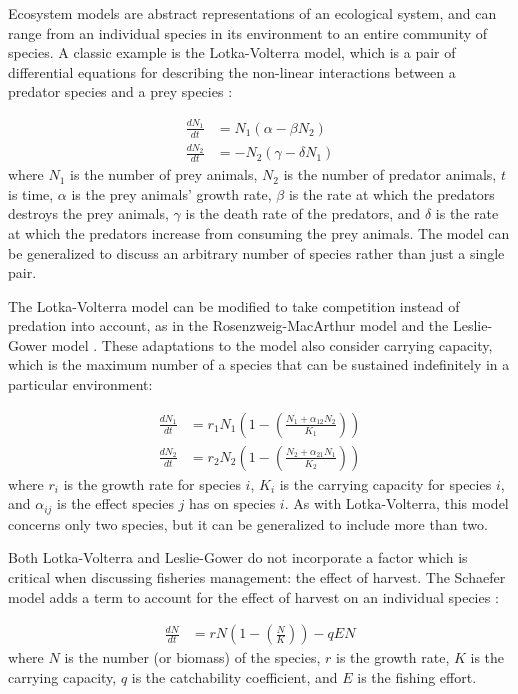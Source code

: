 Ecosystem models are abstract representations of an ecological system, and can range from an individual species in its environment to an entire community of species.  A classic example is the Lotka-Volterra model, which is a pair of differential equations for describing the non-linear interactions between a predator species and a prey species \cite{lotka1926, volterra1926}:

\begin{align}
   \frac{d N_1}{dt} &=   N_1 \left(\alpha - \beta  N_2\right) 
\\ \frac{d N_2}{dt} &= - N_2 \left(\gamma - \delta N_1\right)
\end{align}
where $N_1$ is the number of prey animals, $N_2$ is the number of predator animals, $t$ is time, $\alpha$ is the prey animals' growth rate, $\beta$ is the rate at which the predators destroys the prey animals, $\gamma$ is the death rate of the predators, and $\delta$ is the rate at which the predators increase from consuming the prey animals.  The model can be generalized to discuss an arbitrary number of species rather than just a single pair.

The Lotka-Volterra model can be modified to take competition instead of predation into account, as in the Rosenzweig-MacArthur model \cite{rosenzweig1963} and the Leslie-Gower model \cite{leslie1960}.  These adaptations to the model also consider carrying capacity, which is the maximum number of a species that can be sustained indefinitely in a particular environment:

\begin{align}
   \frac{d N_1}{dt} &= r_1 N_1 \left(1 - \left(\frac{N_1 + \alpha_{12} N_2}{K_1}\right)\right)
\\ \frac{d N_2}{dt} &= r_2 N_2 \left(1 - \left(\frac{N_2 + \alpha_{21} N_1}{K_2}\right)\right)
\end{align}
where $r_i$ is the growth rate for species $i$, $K_i$ is the carrying capacity for species $i$, and $\alpha_{ij}$ is the effect species $j$ has on species $i$.  As with Lotka-Volterra, this model concerns only two species, but it can be generalized to include more than two.

Both Lotka-Volterra and Leslie-Gower do not incorporate a factor which is critical when discussing fisheries management: the effect of harvest.  The Schaefer model adds a term to account for the effect of harvest on an individual species \cite{schaefer1957}:

\begin{align}
   \frac{d N}{dt} &= r N \left(1 - \left(\frac{N}{K}\right)\right) - q E N
\end{align}
where $N$ is the number (or biomass) of the species, $r$ is the growth rate, $K$ is the carrying capacity, $q$ is the catchability coefficient, and $E$ is the fishing effort.

